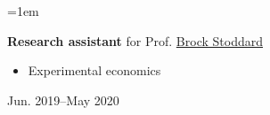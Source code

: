 \documentclass[12pt]{article}
\newenvironment{highlightsforbulletentries}{
	\begin{itemize}[
		topsep=0.10 cm,
		partopsep=0pt,
		leftmargin=20pt,
		]
	\setlength{\parsep}{0.10cm}\setlength{\itemsep}{-2pt}
	}{
	\end{itemize}
}
\newenvironment{twocolentry}[2][]{%
	\par\noindent\def\secondColumn{#2}%
	\begin{minipage}[t]{\linewidth-5.1cm}\raggedright\hangindent=1em\hangafter=1\relax%
	}
	{%
		\end{minipage}\hfill%
		\begin{minipage}[t]{5cm}\raggedleft\secondColumn\end{minipage}\par\smallskip
	}
\begin{document}
\begin{twocolentry}
    {Jun. 2019--May 2020}
    \textbf{Research assistant} for Prof. \href{https://sites.google.com/a/appstate.edu/brock_stoddard/home}{Brock Stoddard}
    \begin{highlightsforbulletentries}
        \item Experimental economics
    \end{highlightsforbulletentries}
\end{twocolentry}

\end{document}
